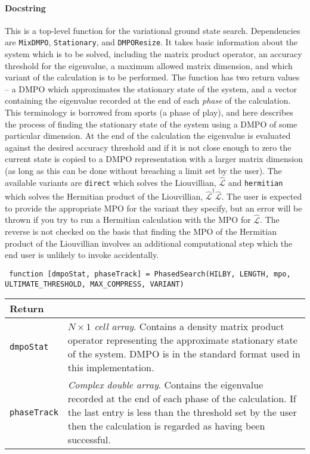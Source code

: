  \paragraph{Docstring} This is a top-level function for the variational ground state search. Dependencies are \lstinline$MixDMPO$, \lstinline$Stationary$, and \lstinline$DMPOResize$. It takes basic information about the system which is to be solved, including the matrix product operator, an accuracy threshold for the eigenvalue, a maximum allowed matrix dimension, and which variant of the calculation is to be performed. The function has two return values -- a DMPO which approximates the stationary state of the system, and a vector containing the eigenvalue recorded at the end of each \emph{phase} of the calculation. This terminology is borrowed from sports (a phase of play), and here describes the process of finding the stationary state of the system using a DMPO of some particular dimension. At the end of the calculation the eigenvalue is evaluated against the desired accuracy threshold and if it is not close enough to zero the current state is copied to a DMPO representation with a larger matrix dimension (as long as this can be done without breaching a limit set by the user). The available variants are \lstinline$direct$ which solves the Liouvillian, \(\hat{\mathcal{L}}\) and \lstinline$hermitian$ which solves the Hermitian product of the Liouvillian, \(\hat{\mathcal{L}}^{\dagger}\hat{\mathcal{L}}\). The user is expected to provide the appropriate MPO for the variant they specify, but an error will be thrown if you try to run a Hermitian calculation with the MPO for \(\hat{\mathcal{L}}\). The reverse is not checked on the basis that finding the MPO of the Hermitian product of the Liouvillian involves an additional computational step which the end user is unlikely to invoke accidentally.

 \begin{lstlisting}
 function [dmpoStat, phaseTrack] = PhasedSearch(HILBY, LENGTH, mpo, ULTIMATE_THRESHOLD, MAX_COMPRESS, VARIANT)
 \end{lstlisting} 
 \begin{longtabu}{X[1,1]X[4,1]}
 \hline
 Return & \\ \hline
 \lstinline$dmpoStat$ & \emph{\(N \times 1\) cell array}. Contains a density matrix product operator representing the approximate stationary state of the system. DMPO is in the standard format used in this implementation. \\
 \lstinline$phaseTrack$ & \emph{Complex double array}. Contains the eigenvalue recorded at the end of each phase of the calculation. If the last entry is less than the threshold set by the user then the calculation is regarded as having been successful.
 \end{longtabu}
 
